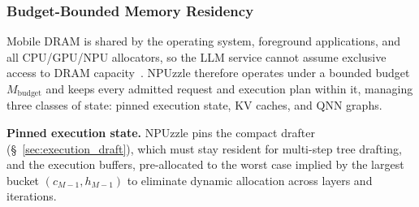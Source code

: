 \documentclass[sigconf,nonacm,10pt]{acmart}
\newcommand{\name}{NPUzzle\xspace}
\begin{document}
{\subsubsection{Budget-Bounded Memory Residency} \label{sec:memory_manager}
Mobile DRAM is shared by the operating system, foreground applications, and all CPU/GPU/NPU allocators, so the LLM service cannot assume exclusive access to DRAM capacity~\cite{yuan2024mobilefoundation,yin2024systemservice}. \name therefore operates under a bounded budget $M_{\mathrm{budget}}$ and keeps every admitted request and execution plan within it, managing three classes of state: pinned execution state, KV caches, and QNN graphs.


\noindent\textbf{Pinned execution state.}
\name pins the compact drafter (\S~\ref{sec:execution_draft}), which must stay resident for multi-step tree drafting, and the execution buffers, pre-allocated to the worst case implied by the {\color{red}largest bucket $(c_{M-1},h_{M-1})$} to eliminate dynamic allocation across layers and iterations.


}
\end{document}
